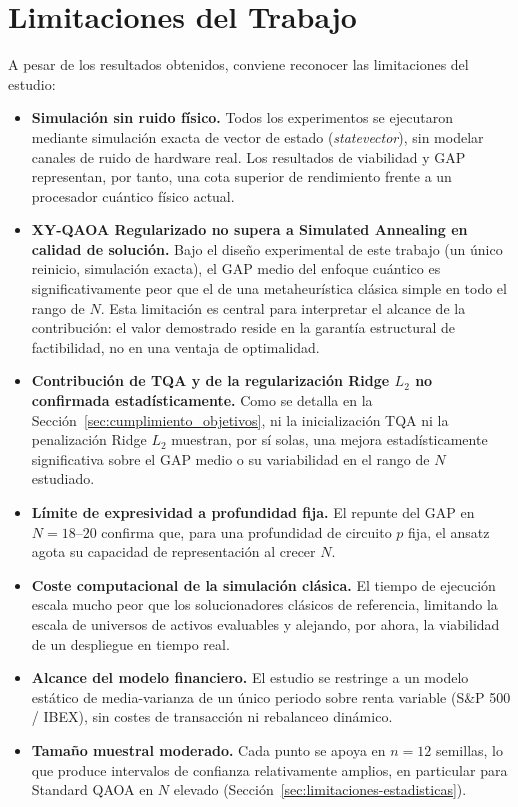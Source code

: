 \section{Limitaciones del Trabajo}
\label{sec:limitaciones}

A pesar de los resultados obtenidos, conviene reconocer las limitaciones del estudio:

\begin{itemize}
    \item \textbf{Simulación sin ruido físico.} Todos los experimentos se ejecutaron mediante simulación exacta
    de vector de estado (\emph{statevector}), sin modelar canales de ruido de hardware real. Los resultados de
    viabilidad y GAP representan, por tanto, una cota superior de rendimiento frente a un procesador cuántico
    físico actual.
    \item \textbf{XY-QAOA Regularizado no supera a Simulated Annealing en calidad de solución.} Bajo el diseño
    experimental de este trabajo (un único reinicio, simulación exacta), el GAP medio del enfoque cuántico es
    significativamente peor que el de una metaheurística clásica simple en todo el rango de $N$. Esta limitación
    es central para interpretar el alcance de la contribución: el valor demostrado reside en la garantía
    estructural de factibilidad, no en una ventaja de optimalidad.
    \item \textbf{Contribución de TQA y de la regularización Ridge $L_2$ no confirmada estadísticamente.} Como se
    detalla en la Sección~\ref{sec:cumplimiento_objetivos}, ni la inicialización TQA ni la penalización Ridge
    $L_2$ muestran, por sí solas, una mejora estadísticamente significativa sobre el GAP medio o su variabilidad
    en el rango de $N$ estudiado.
    \item \textbf{Límite de expresividad a profundidad fija.} El repunte del GAP en $N=18$--$20$ confirma que,
    para una profundidad de circuito $p$ fija, el ansatz agota su capacidad de representación al crecer $N$.
    \item \textbf{Coste computacional de la simulación clásica.} El tiempo de ejecución escala mucho peor que los
    solucionadores clásicos de referencia, limitando la escala de universos de activos evaluables y alejando,
    por ahora, la viabilidad de un despliegue en tiempo real.
    \item \textbf{Alcance del modelo financiero.} El estudio se restringe a un modelo estático de media-varianza
    de un único periodo sobre renta variable (S\&P 500 / IBEX), sin costes de transacción ni rebalanceo dinámico.
    \item \textbf{Tamaño muestral moderado.} Cada punto se apoya en $n=12$ semillas, lo que produce intervalos de
    confianza relativamente amplios, en particular para Standard QAOA en $N$ elevado (Sección~\ref{sec:limitaciones-estadisticas}).
\end{itemize}

